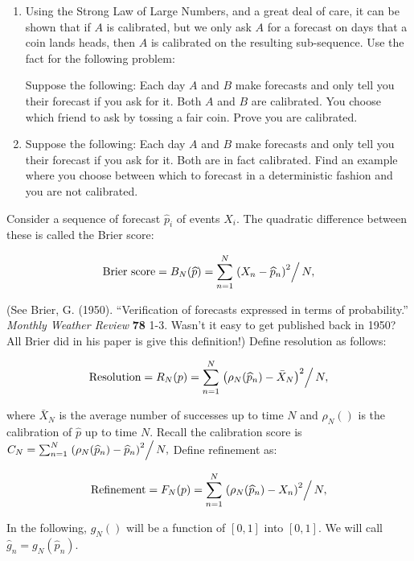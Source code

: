 \documentclass{book}
\newcounter{homeworkcounter}[chapter]
\renewcommand{\thehomeworkcounter}{%
  \fbox{\bf\thechapter.\arabic{homeworkcounter}}%
  }
\newenvironment{HW}{
  \begin{list}{\thehomeworkcounter\hfill}{
      \usecounter{homeworkcounter}
      \setlength{\labelwidth}{1cm}
      \setlength{\labelsep}{0.3cm}
      \setlength{\leftmargin}{1.3cm}
      \setlength{\rightmargin}{1cm}
      \setlength{\parsep}{0.5ex plus0.2ex minus0.1ex}
      \setlength{\itemsep}{0ex plus0.2ex} \sl}}%
  {\end{list}}
\begin{document}
\begin{HW}
\begin{enumerate}
\begin{enumerate}
\item Using the Strong Law of Large Numbers, and a great deal of care,
  it can be shown that if $A$ is calibrated, but we only ask $A$ for a
  forecast on days that a coin lands heads, then $A$ is calibrated on
  the resulting sub-sequence.  Use the fact for the following problem: 

  Suppose the following: Each day $A$ and $B$ make forecasts and only
  tell you their forecast if you ask for it.  Both $A$ and $B$ are
  calibrated.  You choose which friend to ask by tossing a fair coin.
  Prove you are calibrated.

        \item Suppose the following: Each day $A$ and $B$ make
forecasts and only tell you their forecast if you ask for it.  Both
are in fact calibrated.  Find an example where you choose between
which to forecast in a deterministic fashion and you are not
calibrated.
\end{enumerate} \end{enumerate}

\item Consider a sequence of forecast $\widehat{p}_i$ of events $X_i$.
  The quadratic difference between these is called the Brier score:

$$\hbox{Brier score} = B_N(\widehat{p}) =  \sum_{n=1}^{N} \left.
        \left( X_n - \widehat{p}_n \right)^2\right/N,$$
\label{def:brier_score}

\noindent (See Brier, G. (1950).  ``Verification of forecasts expressed
in terms of probability.'' {\it Monthly Weather Review} {\bf 78} 1-3.
Wasn't it easy to get published back in 1950?  All Brier did in his
paper is give this definition!)  Define resolution as follows:

$$\hbox{Resolution} = R_N(p) =  \sum_{n=1}^{N} \left.
        \left( \rho_N(\widehat{p}_n) - \bar{X}_N \right)^2\right/N,$$

\noindent where $\bar{X}_N$ is the average number of successes up to
time $N$ and $\rho_N()$ is the calibration of $\widehat{p}$ up to time
$N$.  Recall the calibration score is $C_N =\sum_{n=1}^{N} \left.
\left( \rho_N(\widehat{p}_n) - \widehat{p}_n\right)^2\right/N,$  Define
refinement as: 

$$ \hbox{Refinement} = F_N(p) =  \sum_{n=1}^{N} \left.
        \left( \rho_N(\widehat{p}_n) - X_n \right)^2\right/N,$$

\noindent In the following, $g_N()$ will be a function of $[0,1]$ into
$[0,1]$.  We will call $\widehat{g}_n = g_N(\widehat{p}_n)$.


\end{HW}
\end{document}
